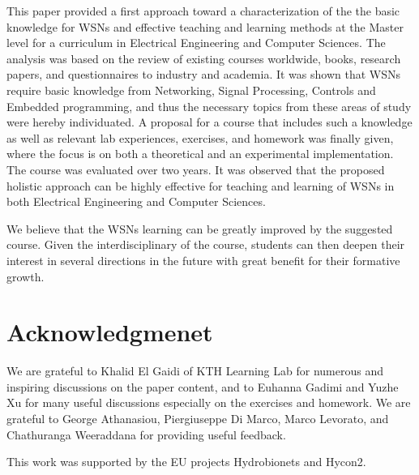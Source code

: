 \documentclass[onecolumn,12pt,draftclsnofoot,a4paper,peerreview]{IEEEtran}
\begin{document}
This paper provided a first approach toward a characterization of the the basic knowledge for WSNs and effective teaching and learning methods at the Master level for a curriculum in Electrical Engineering and Computer Sciences. The analysis was based on the review of existing courses worldwide, books, research papers, and questionnaires to industry and academia. It was shown that WSNs require basic knowledge from Networking, Signal Processing, Controls and Embedded programming, and thus the necessary topics from these areas of study were hereby individuated. A proposal for a course that includes such a knowledge as well as relevant lab experiences, exercises, and homework was finally given, where the focus is on both a theoretical and an experimental implementation. The course was evaluated over two years. It was observed that the proposed holistic approach can be highly effective for teaching and learning of WSNs in both Electrical Engineering and Computer Sciences. 

We believe that the WSNs learning can be greatly improved by the suggested course. Given the interdisciplinary of the course, students can then deepen their interest in several directions in the future with great benefit for their formative growth. 

\section{Acknowledgmenet}

We are grateful to Khalid El Gaidi of KTH Learning Lab for numerous and inspiring discussions on the paper content, and to Euhanna Gadimi and Yuzhe Xu for many useful discussions especially on the exercises and homework. We are grateful to George Athanasiou, Piergiuseppe Di Marco, Marco Levorato, and Chathuranga Weeraddana for providing useful feedback. 

This work was supported by the EU projects Hydrobionets and Hycon2. 



\end{document}

